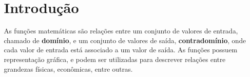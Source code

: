 \section{Introdução}

As funções matemáticas são relações entre um conjunto de valores de entrada, chamado de \textbf{domínio}, e um conjunto de valores de saída, \textbf{contradomínio}, onde cada valor de entrada está associado a um valor de saída. As funções possuem representação gráfica, e podem ser utilizadas para descrever relações entre grandezas físicas, econômicas, entre outras. 